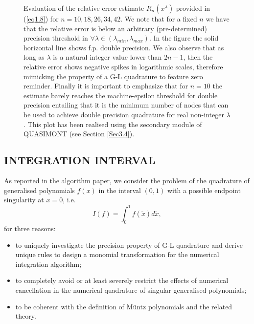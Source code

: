\documentclass[a4paper, twosided]{book}
\begin{document}
\begin{center}
        \begin{figure}[t]
        \captionsetup{singlelinecheck=off}
        
        \caption{Evaluation of the relative error estimate $R_n(x^{\lambda})$ provided in (\ref{eq1.8}) for $n=10,18,26,34,42$. We note that for a fixed $n$ we have that the relative error is  below an arbitrary (pre-determined) precision threshold in  $\forall\lambda\in(\lambda_{min},\lambda_{max})$. In the figure the solid horizontal line shows f.p. double precision.  We also observe that as long as $\lambda$ is a natural integer value lower than $2n-1$, then the relative error shows negative spikes in logarithmic scales, therefore mimicking the property of a G-L quadrature to feature zero reminder. Finally it is important to emphasize that for $n=10$ the estimate barely reaches the machine-epsilon threshold for double precision entailing that it is the minimum number of nodes that can be used to achieve double precision quadrature for real non-integer $\lambda$. This plot has been realised using the secondary module of QUASIMONT (see Section \ref{Sec3.4}).}
        \label{Fig1.1}
        \end{figure}
\end{center}

\subsection[Integration interval]{\changefont INTEGRATION INTERVAL}\label{SubSec1.2.5}

As reported in the algorithm paper, we consider the problem of the quadrature of generalised polynomials $f(x)$ in the interval $(0,1)$ with a possible endpoint singularity at $x=0$, i.e. 
\begin{equation}\label{eq1.11}
    I(f) = \int_0^1 f(\tilde{x}) d\tilde{x},
\end{equation}
for three reasons:
\begin{itemize}
  \item to uniquely investigate the precision property of G-L quadrature and derive unique rules to design a monomial transformation for the numerical integration algorithm;
  \item to completely avoid or at least severely restrict the effects of numerical cancellation in the numerical quadrature of singular generalised polynomials;
  \item to be coherent with the definition of Müntz polynomials and the related theory.
\end{itemize}
\end{document}
